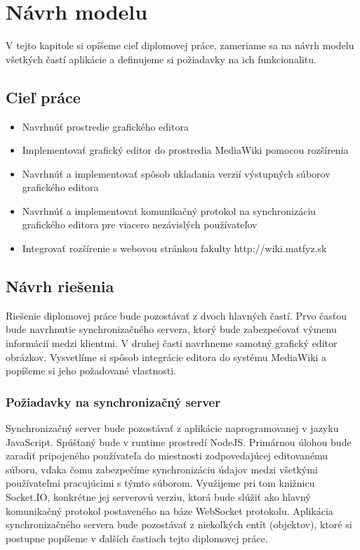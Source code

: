 \chapter{Návrh modelu}\label{chap:proposal}

V tejto kapitole si opíšeme cieľ diplomovej práce, zameriame sa na návrh modelu všetkých častí aplikácie a definujeme si požiadavky na ich funkcionalitu. 

\section{Cieľ práce}
\begin{itemize}
	\item Navrhnúť prostredie grafického editora
	\item Implementovať grafický editor do prostredia MediaWiki pomocou rozšírenia
	\item Navrhnúť a implementovať spôsob ukladania verzií výstupných súborov grafického editora
	\item Navrhnúť a implementovat komunikačný protokol na synchronizáciu grafického editora pre viacero nezávislých používateľov
	\item Integrovať rozšírenie s webovou stránkou fakulty http://wiki.matfyz.sk
\end{itemize}

\section{Návrh riešenia}
Riešenie diplomovej práce bude pozostávať z dvoch hlavných častí. Prvo časťou bude navrhnutie synchronizačného servera, ktorý bude zabezpečovať výmenu informácií medzi klientmi. V druhej časti navrhneme samotný grafický editor obrázkov. Vysvetlíme si spôsob integrácie editora do systému MediaWiki a popíšeme si jeho požadované vlastnosti.

\subsection{Požiadavky na synchronizačný server}\label{sec:poziadavky_na_server}
Synchronizačný server bude pozostávať z aplikácie naprogramovanej v jazyku JavaScript. Spúšťaný bude v runtime prostredí NodeJS. Primárnou úlohou bude zaradiť pripojeného používateľa do miestnosti zodpovedajúcej editovanému súboru, vďaka čomu zabezpečíme synchronizáciu údajov medzi všetkými používateľmi pracujúcimi s týmto súborom. Využijeme pri tom knižnicu Socket.IO, konkrétne jej serverovú verziu, ktorá bude slúžiť ako hlavný komunikačný protokol postaveného na báze WebSocket protokolu. Aplikácia synchronizačného servera bude pozostávať z niekoľkých entít (objektov), ktoré si postupne popíšeme v ďalších častiach tejto diplomovej práce.

